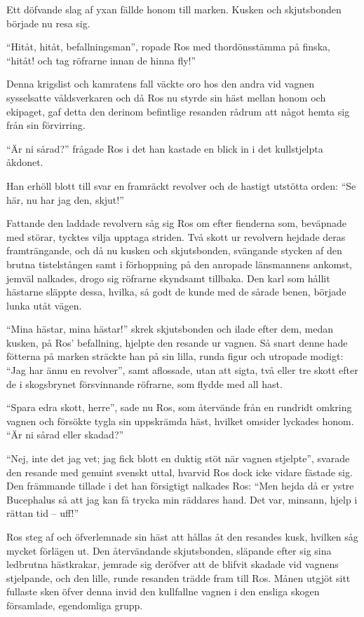 Ett döfvande slag af yxan fällde honom till marken. Kusken och
skjutsbonden började nu resa sig.

``Hitåt, hitåt, befallningsman'', ropade Ros med thordönsstämma på
finska, ``hitåt! och tag röfrarne innan de hinna fly!''

Denna krigslist och kamratens fall väckte oro hos den andra vid vagnen
sysselsatte våldsverkaren och då Ros nu styrde sin häst mellan honom och
ekipaget, gaf detta den derinom befintlige resanden rådrum att något
hemta sig från sin förvirring.

``Är ni sårad?'' frågade Ros i det han kastade en blick in i det
kullstjelpta åkdonet.

Han erhöll blott till svar en framräckt revolver och de hastigt utstötta
orden: ``Se här, nu har jag den, skjut!''

Fattande den laddade revolvern såg sig Ros om efter fienderna som,
beväpnade med störar, tycktes vilja upptaga striden. Två skott ur
revolvern hejdade deras framträngande, och då nu kusken och
skjutsbonden, svängande stycken af den brutna tistelstången samt i
förhoppning på den anropade länsmannens ankomst, jemväl nalkades, drogo
sig röfrarne skyndsamt tillbaka. Den karl som hållit hästarne släppte
dessa, hvilka, så godt de kunde med de sårade benen, började lunka utåt
vägen.

``Mina hästar, mina hästar!'' skrek skjutsbonden och ilade efter dem,
medan kusken, på Ros' befallning, hjelpte den resande ur vagnen. Så
snart denne hade fötterna på marken sträckte han på sin lilla, runda
figur och utropade modigt: ``Jag har ännu en revolver'', samt aflossade,
utan att sigta, två eller tre skott efter de i skogsbrynet försvinnande
röfrarne, som flydde med all hast.

``Spara edra skott, herre'', sade nu Ros, som återvände från en rundridt
omkring vagnen och försökte tygla sin uppskrämda häst, hvilket omsider
lyckades honom. ``Är ni sårad eller skadad?''

``Nej, inte det jag vet; jag fick blott en duktig stöt när vagnen
stjelpte'', svarade den resande med genuint svenskt uttal, hvarvid Ros
dock icke vidare fästade sig. Den främmande tillade i det han försigtigt
nalkades Ros: ``Men hejda då er ystre Bucephalus så att jag kan få
trycka min räddares hand. Det var, minsann, hjelp i rättan tid -- uff!''

Ros steg af och öfverlemnade sin häst att hållas åt den resandes kusk,
hvilken såg mycket förlägen ut. Den återvändande skjutsbonden, släpande
efter sig sina ledbrutna hästkrakar, jemrade sig deröfver att de blifvit
skadade vid vagnens stjelpande, och den lille, runde resanden trädde
fram till Ros. Månen utgjöt sitt fullaste sken öfver denna invid den
kullfallne vagnen i den ensliga skogen församlade, egendomliga grupp.

